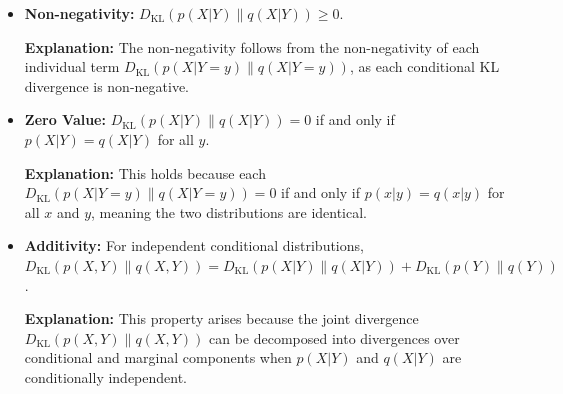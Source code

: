 \begin{itemize}
    \item \textbf{Non-negativity:} \( D_{\text{KL}}(p(X|Y) \parallel q(X|Y)) \geq 0 \).

          \textbf{Explanation:}
          The non-negativity follows from the non-negativity of each individual term \( D_{\text{KL}}(p(X|Y = y) \parallel q(X|Y = y)) \), as each conditional KL divergence is non-negative.

    \item \textbf{Zero Value:} \( D_{\text{KL}}(p(X|Y) \parallel q(X|Y)) = 0 \) if and only if \( p(X|Y) = q(X|Y) \) for all \( y \).

          \textbf{Explanation:}
          This holds because each \( D_{\text{KL}}(p(X|Y = y) \parallel q(X|Y = y)) = 0 \) if and only if \( p(x|y) = q(x|y) \) for all \( x \) and \( y \), meaning the two distributions are identical.

    \item \textbf{Additivity:} For independent conditional distributions, \( D_{\text{KL}}(p(X,Y) \parallel q(X,Y)) = D_{\text{KL}}(p(X|Y) \parallel q(X|Y)) + D_{\text{KL}}(p(Y) \parallel q(Y)) \).

          \textbf{Explanation:}
          This property arises because the joint divergence \( D_{\text{KL}}(p(X,Y) \parallel q(X,Y)) \) can be decomposed into divergences over conditional and marginal components when \( p(X|Y) \) and \( q(X|Y) \) are conditionally independent.
\end{itemize}


